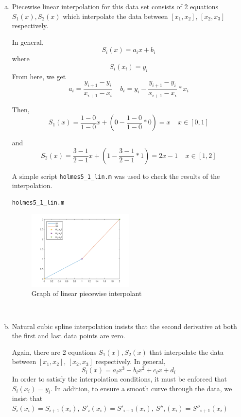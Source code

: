 \documentclass[11pt]{article}
\begin{document}
\begin{enumerate}
\begin{enumerate}[(a)]
			\item Piecewise linear interpolation for this data set consists of 2 equations $S_1(x), S_2(x)$ which
				interpolate the data between $[x_1, x_2]$, $[x_2, x_3]$ respectively.

				In general, $$S_i(x) = a_ix+b_i$$ where $$S_i(x_i) = y_i$$ From here, we get
				$$a_i = \frac{y_{i+1}-y_i}{x_{i+1}-x_i}\ \ \ \ \ b_i = y_i - \frac{y_{i+1}-y_i}{x_{i+1}-x_i}*x_i$$

				Then,
				\[
					S_1(x) = \frac{1-0}{1-0}x + (0-\frac{1-0}{1-0}*0)
					=x\ \ \ \ \ x\in[0,1]
				\]

				and
				\[
					S_2(x) = \frac{3-1}{2-1}x + (1-\frac{3-1}{2-1}*1)
					=2x - 1\ \ \ \ \ x\in[1,2]
				\]

				A simple script \texttt{holmes5\_1\_lin.m} was used to check the results of the interpolation.

				\begin{center}
					\texttt{holmes5\_1\_lin.m}
				\end{center}
				

				\begin{figure}[H]
					\centering
					\includegraphics[width=0.5\textwidth]{holmes5_1_lin.png}
					\caption{Graph of linear piecewise interpolant}
				\end{figure} \

			\item Natural cubic spline interpolation insists that the second derivative at both the first and last data points
				are zero.

				Again, there are 2 equations $S_1(x), S_2(x)$ that interpolate the data between $[x_1, x_2]$, $[x_2,x_3]$
				respectively. In general, $$S_i(x) = a_ix^3 + b_ix^2+c_ix+d_i$$
				In order to satisfy the interpolation conditions, it must be enforced that $S_i(x_i) = y_i$. In addition, to
				ensure a smooth curve through the data, we insist that $S_i(x_i) = S_{i+1}(x_i),\ S'_i(x_i) = S'_{i+1}(x_i),\
				S''_i(x_i) = S''_{i+1}(x_i)$


\end{enumerate}
\end{enumerate}
\end{document}
